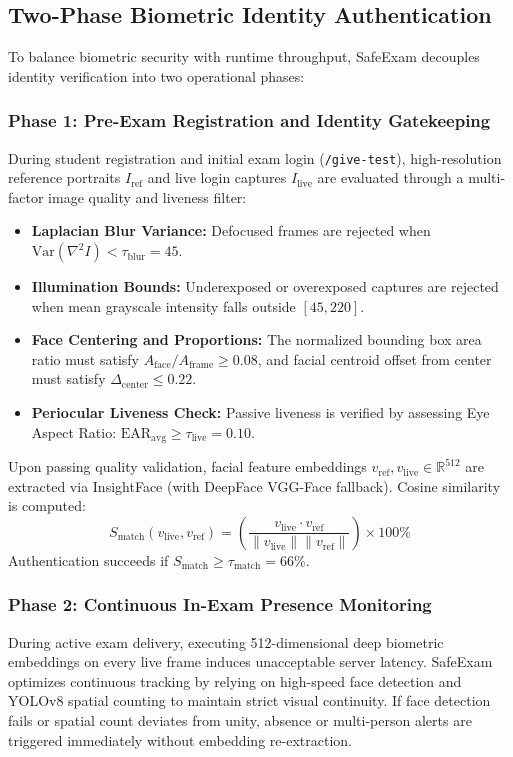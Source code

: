 \documentclass[conference]{IEEEtran}
\begin{document}
\subsection{Two-Phase Biometric Identity Authentication}
To balance biometric security with runtime throughput, SafeExam decouples identity verification into two operational phases:

\subsubsection{Phase 1: Pre-Exam Registration and Identity Gatekeeping}
During student registration and initial exam login (\texttt{/give-test}), high-resolution reference portraits $I_{\text{ref}}$ and live login captures $I_{\text{live}}$ are evaluated through a multi-factor image quality and liveness filter:
\begin{itemize}
    \item \textbf{Laplacian Blur Variance:} Defocused frames are rejected when $\text{Var}(\nabla^2 I) < \tau_{\text{blur}} = 45$.
    \item \textbf{Illumination Bounds:} Underexposed or overexposed captures are rejected when mean grayscale intensity falls outside $[45, 220]$.
    \item \textbf{Face Centering and Proportions:} The normalized bounding box area ratio must satisfy $A_{\text{face}} / A_{\text{frame}} \ge 0.08$, and facial centroid offset from center must satisfy $\Delta_{\text{center}} \le 0.22$.
    \item \textbf{Periocular Liveness Check:} Passive liveness is verified by assessing Eye Aspect Ratio: $\text{EAR}_{\text{avg}} \ge \tau_{\text{live}} = 0.10$.
\end{itemize}
Upon passing quality validation, facial feature embeddings $v_{\text{ref}}, v_{\text{live}} \in \mathbb{R}^{512}$ are extracted via InsightFace (with DeepFace VGG-Face fallback). Cosine similarity is computed:
\begin{equation}
S_{\text{match}}(v_{\text{live}}, v_{\text{ref}}) = \left( \frac{v_{\text{live}} \cdot v_{\text{ref}}}{\|v_{\text{live}}\| \|v_{\text{ref}}\|} \right) \times 100\%
\label{eq:cosine}
\end{equation}
Authentication succeeds if $S_{\text{match}} \ge \tau_{\text{match}} = 66\%$.

\subsubsection{Phase 2: Continuous In-Exam Presence Monitoring}
During active exam delivery, executing 512-dimensional deep biometric embeddings on every live frame induces unacceptable server latency. SafeExam optimizes continuous tracking by relying on high-speed face detection and YOLOv8 spatial counting to maintain strict visual continuity. If face detection fails or spatial count deviates from unity, absence or multi-person alerts are triggered immediately without embedding re-extraction.
\end{document}
